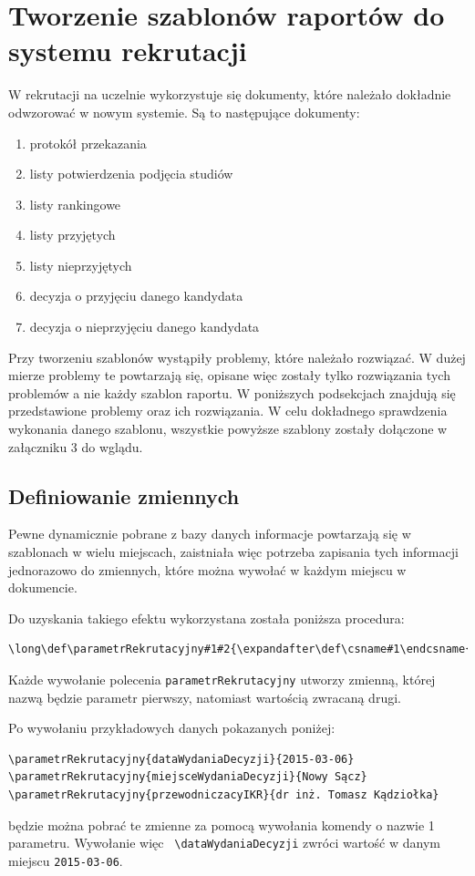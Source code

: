\section{Tworzenie szablonów raportów do systemu rekrutacji}

W rekrutacji na uczelnie wykorzystuje się dokumenty, które należało dokładnie odwzorować w nowym systemie. Są to następujące dokumenty:\\
\begin{enumerate}
\item protokół przekazania
\item listy potwierdzenia podjęcia studiów 
\item listy rankingowe 
\item listy przyjętych
\item listy nieprzyjętych
\item decyzja o przyjęciu danego kandydata
\item decyzja o nieprzyjęciu danego kandydata 
\end{enumerate}
\vspace{5mm}
\par
Przy tworzeniu szablonów wystąpiły problemy, które należało rozwiązać.  W dużej mierze problemy te powtarzają się,  opisane więc zostały tylko rozwiązania tych problemów a nie każdy szablon raportu. W poniższych podsekcjach znajdują się przedstawione problemy oraz ich rozwiązania. W celu dokładnego sprawdzenia wykonania danego szablonu, wszystkie powyższe szablony zostały dołączone w załączniku 3 do wglądu.
\subsection{Definiowanie zmiennych}

Pewne dynamicznie pobrane z bazy danych informacje powtarzają się w szablonach w wielu miejscach, zaistniała więc potrzeba zapisania tych informacji jednorazowo do zmiennych, które można wywołać w każdym miejscu w dokumencie. 
\par
Do uzyskania takiego efektu wykorzystana została poniższa procedura:
 \begin{lstlisting}
\long\def\parametrRekrutacyjny#1#2{\expandafter\def\csname#1\endcsname{#2}}
 \end{lstlisting}
Każde wywołanie polecenia \texttt{parametrRekrutacyjny} utworzy zmienną, której nazwą będzie parametr pierwszy, natomiast wartością zwracaną drugi.
\par 
Po wywołaniu przykładowych danych pokazanych poniżej:
 \begin{lstlisting}
\parametrRekrutacyjny{dataWydaniaDecyzji}{2015-03-06}
\parametrRekrutacyjny{miejsceWydaniaDecyzji}{Nowy Sącz}
\parametrRekrutacyjny{przewodniczacyIKR}{dr inż. Tomasz Kądziołka}
 \end{lstlisting}
będzie można pobrać te zmienne za pomocą wywołania komendy o nazwie 1 parametru. Wywołanie więc \texttt{ \textbackslash dataWydaniaDecyzji} zwróci wartość w danym miejscu \texttt{2015-03-06}.

